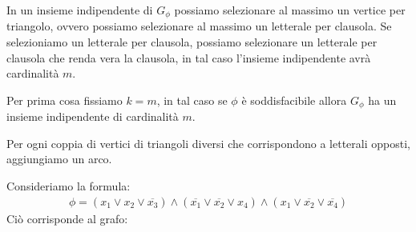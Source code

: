 \begin{itemize}
\begin{figure}[H]
    \end{figure}
    In un insieme indipendente di $G_\phi$ possiamo selezionare al massimo un vertice per triangolo,
    ovvero possiamo selezionare al massimo un letterale per clausola. Se selezioniamo un letterale
    per clausola, possiamo selezionare un letterale per clausola che renda vera la clausola, in tal
    caso l'insieme indipendente avrà cardinalità $m$.

    Per prima cosa fissiamo $k = m$, in tal caso se $\phi$ è soddisfacibile allora $G_\phi$ ha un insieme
    indipendente di cardinalità $m$.

    Per ogni coppia di vertici di triangoli diversi che corrispondono a letterali opposti, aggiungiamo un
    arco.

    Consideriamo la formula:
    \begin{align*}
        \phi = (x_1 \lor x_2 \lor \overline{x_3}) \land (\overline{x_1} \lor 
        \overline{x_2} \lor x_4) \land (x_1 \lor \overline{x_2} \lor \overline{x_4})
    \end{align*} 
    Ciò corrisponde al grafo:
    \begin{figure}[H]
        \centering 
\end{figure}
\end{itemize}
